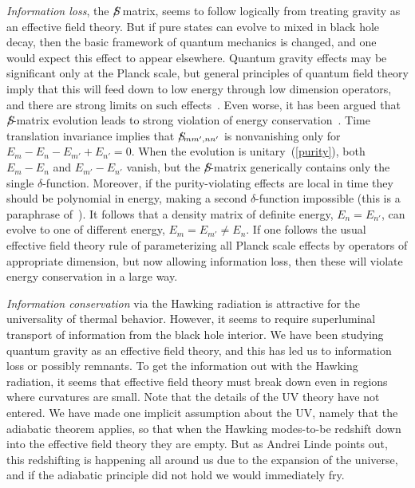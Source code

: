 \documentclass[12pt]{article}
\begin{document}
{\it Information loss}, the $S \hspace{-7pt}/$ matrix, seems to follow logically from treating gravity as an effective field theory.  But if pure states can evolve to mixed in black hole decay, then the basic framework of quantum mechanics is changed, and one would expect this effect to appear elsewhere.  Quantum gravity effects may be significant only at the Planck scale, but general principles of quantum field theory imply that this will feed down to low energy through low dimension operators, and there are strong limits on such effects~\cite{Ellis:1983jz}.  Even worse, it has been argued that $S \hspace{-7pt}/$-matrix evolution leads to strong violation of energy conservation~\cite{Banks:1983by}.  Time translation invariance implies that $S \hspace{-7pt} /_{mm',nn'}$ is nonvanishing only for $E_m - E_n - E_{m'} + E_{n'} = 0$.  When the evolution is unitary~(\ref{purity}),
both $E_m - E_{n}$ and $E_{m'} - E_{n'}$ vanish, but the $S \hspace{-7pt}/$-matrix generically contains only the single $\delta$-function.  Moreover, if the purity-violating effects are local in time they should be polynomial in energy, making a second $\delta$-function impossible (this is a paraphrase of~\cite{Banks:1983by}).
It follows that a density matrix of definite energy, $E_n =  E_{n'}$, can evolve to one of different energy,  $E_m =  E_{m'} \neq E_n$.
  If one follows the usual effective field theory rule of parameterizing all Planck scale effects by operators of appropriate dimension, but now allowing information loss, then these will violate energy conservation in a large way.

{\it Information conservation} via the Hawking radiation is attractive for the universality of thermal behavior.  However, it seems to require superluminal transport of information from the black hole interior.  We have been studying quantum gravity as an effective field theory, and this has led us to information loss or possibly remnants.  To get the information out  with the Hawking radiation, it seems that effective field theory must break down even in regions where curvatures are small.  Note that the details of the UV theory have not entered.  We have made one implicit assumption about the UV, namely that the adiabatic theorem applies, so that when the Hawking modes-to-be redshift down into the effective field theory they are empty.  But as Andrei Linde points out, this redshifting is happening all around us due to the expansion of the universe, and if the adiabatic principle did not hold we would immediately fry. 
\end{document}
